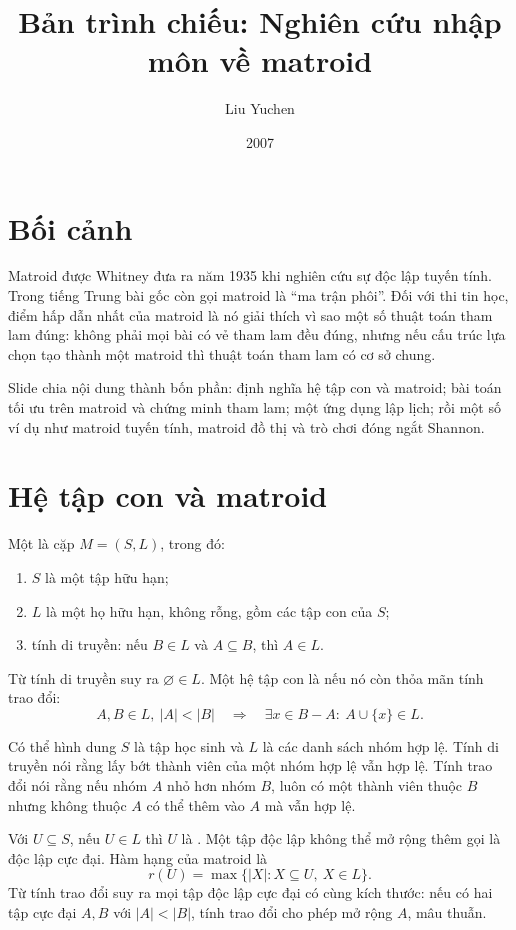 \documentclass[11pt]{article}
\title{Bản trình chiếu: Nghiên cứu nhập môn về matroid}
\author{Liu Yuchen}
\date{2007}
\begin{document}
\maketitle


\section{Bối cảnh}

Matroid được Whitney đưa ra năm 1935 khi nghiên cứu sự độc lập tuyến tính.
Trong tiếng Trung bài gốc còn gọi matroid là ``ma trận phôi''. Đối với thi
tin học, điểm hấp dẫn nhất của matroid là nó giải thích vì sao một số thuật
toán tham lam đúng: không phải mọi bài có vẻ tham lam đều đúng, nhưng nếu
cấu trúc lựa chọn tạo thành một matroid thì thuật toán tham lam có cơ sở
chung.

Slide chia nội dung thành bốn phần: định nghĩa hệ tập con và matroid; bài
toán tối ưu trên matroid và chứng minh tham lam; một ứng dụng lập lịch; rồi
một số ví dụ như matroid tuyến tính, matroid đồ thị và trò chơi đóng ngắt
Shannon.

\section{Hệ tập con và matroid}

Một  là cặp \(M=(S,L)\), trong đó:
\begin{enumerate}
  \item \(S\) là một tập hữu hạn;
  \item \(L\) là một họ hữu hạn, không rỗng, gồm các tập con của \(S\);
  \item tính di truyền: nếu \(B\in L\) và \(A\subseteq B\), thì \(A\in L\).
\end{enumerate}
Từ tính di truyền suy ra \(\varnothing\in L\). Một hệ tập con là
 nếu nó còn thỏa mãn tính trao đổi:
\[
  A,B\in L,\ |A|<|B|
  \quad\Longrightarrow\quad
  \exists x\in B-A:\ A\cup\{x\}\in L.
\]

Có thể hình dung \(S\) là tập học sinh và \(L\) là các danh sách nhóm hợp lệ.
Tính di truyền nói rằng lấy bớt thành viên của một nhóm hợp lệ vẫn hợp lệ.
Tính trao đổi nói rằng nếu nhóm \(A\) nhỏ hơn nhóm \(B\), luôn có một thành
viên thuộc \(B\) nhưng không thuộc \(A\) có thể thêm vào \(A\) mà vẫn hợp lệ.

Với \(U\subseteq S\), nếu \(U\in L\) thì \(U\) là . Một tập
độc lập không thể mở rộng thêm gọi là độc lập cực đại. Hàm hạng của matroid là
\[
  r(U)=\max\{|X|: X\subseteq U,\ X\in L\}.
\]
Từ tính trao đổi suy ra mọi tập độc lập cực đại có cùng kích thước: nếu có
hai tập cực đại \(A,B\) với \(|A|<|B|\), tính trao đổi cho phép mở rộng \(A\),
mâu thuẫn.
\end{document}
